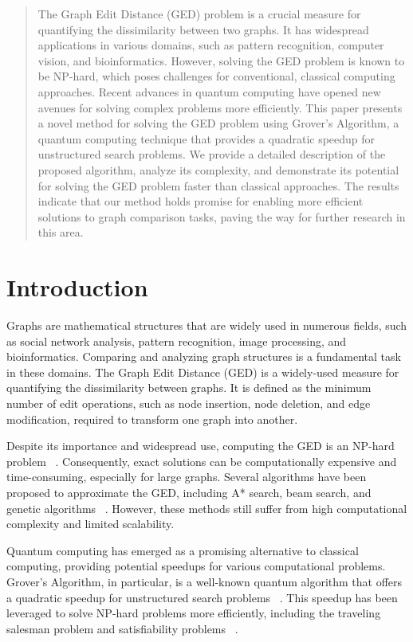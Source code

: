 \begin{abstract}
The Graph Edit Distance (GED) problem is a crucial measure for quantifying the dissimilarity between two graphs. It has widespread applications in various domains, such as pattern recognition, computer vision, and bioinformatics. However, solving the GED problem is known to be NP-hard, which poses challenges for conventional, classical computing approaches. Recent advances in quantum computing have opened new avenues for solving complex problems more efficiently. This paper presents a novel method for solving the GED problem using Grover's Algorithm, a quantum computing technique that provides a quadratic speedup for unstructured search problems. We provide a detailed description of the proposed algorithm, analyze its complexity, and demonstrate its potential for solving the GED problem faster than classical approaches. The results indicate that our method holds promise for enabling more efficient solutions to graph comparison tasks, paving the way for further research in this area.
\end{abstract}

\section{Introduction}

Graphs are mathematical structures that are widely used in numerous fields, such as social network analysis, pattern recognition, image processing, and bioinformatics. Comparing and analyzing graph structures is a fundamental task in these domains. The Graph Edit Distance (GED) is a widely-used measure for quantifying the dissimilarity between graphs. It is defined as the minimum number of edit operations, such as node insertion, node deletion, and edge modification, required to transform one graph into another.

Despite its importance and widespread use, computing the GED is an NP-hard problem ~\cite{ged_np_hard}. Consequently, exact solutions can be computationally expensive and time-consuming, especially for large graphs. Several algorithms have been proposed to approximate the GED, including A* search, beam search, and genetic algorithms ~\cite{ged_approx_algos}. However, these methods still suffer from high computational complexity and limited scalability.

Quantum computing has emerged as a promising alternative to classical computing, providing potential speedups for various computational problems. Grover's Algorithm, in particular, is a well-known quantum algorithm that offers a quadratic speedup for unstructured search problems ~\cite{grover1996fast}. This speedup has been leveraged to solve NP-hard problems more efficiently, including the traveling salesman problem and satisfiability problems ~\cite{grover_applications}.

